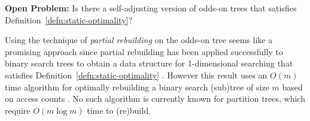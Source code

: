 \documentclass{patmorin}
\newcommand{\defref}[1]{Definition~\ref{defn:#1}}
\begin{document}
\noindent\textbf{Open Problem:} Is there a self-adjusting version of
odds-on trees that satisfies \defref{static-optimality}?

Using the technique of \emph{partial rebuilding} \cite{o83} on the odds-on
tree seems like a promising approach since partial rebuilding has been
applied successfully to binary search trees to obtain a data structure
for 1-dimensional searching that satisfies \defref{static-optimality}
\cite{g00}.  However this result uses an $O(m)$ time algorithm for
optimally rebuilding a binary search (sub)tree of size $m$ based on
access counts \cite{m77}.  No such algorithm is currently known for
partition trees, which require $O(m\log m)$ time to (re)build.




\end{document}
